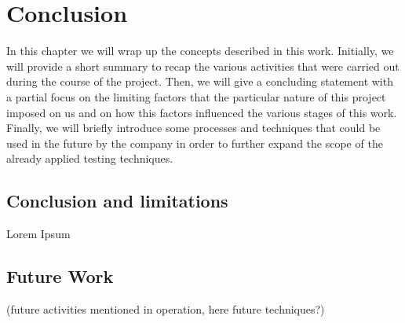 \chapter{Conclusion}

In this chapter we will wrap up the concepts described in this work. Initially, we will provide a short summary to recap the various activities that were carried out during the course of the project. Then, we will give a concluding statement with a partial focus on the limiting factors that the particular nature of this project imposed on us and on how this factors influenced the various stages of this work. Finally, we will briefly introduce some processes and techniques that could be used in the future by the company in order to further expand the scope of the already applied testing techniques.

\section{Conclusion and limitations} 

Lorem Ipsum

\section{Future Work} 

(future activities mentioned in operation, here future techniques?)
